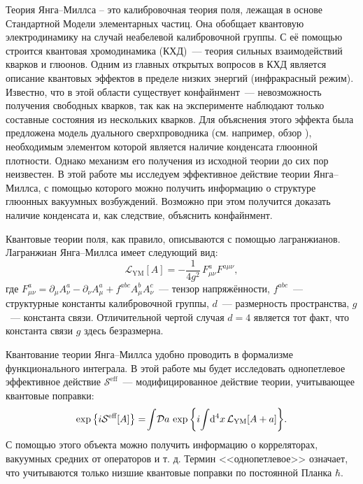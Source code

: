 
Теория Янга--Миллса -- это калибровочная теория поля, лежащая в основе Стандартной Модели элементарных частиц. Она обобщает квантовую электродинамику на случай неабелевой калибровочной группы. С её помощью строится квантовая хромодинамика (КХД)~--- теория сильных взаимодействий кварков и глюонов. Одним из главных открытых вопросов в КХД является описание квантовых эффектов в пределе низких энергий (инфракрасный режим). Известно, что в этой области существует конфайнмент~--- невозможность получения свободных кварков, так как на эксперименте наблюдают только составные состояния из нескольких кварков. Для объяснения этого эффекта была предложена модель дуального сверхпроводника (см. например, обзор \cite{Ripka2003}), необходимым элементом которой является наличие конденсата глюонной плотности. Однако механизм его получения из исходной теории до сих пор неизвестен. В этой работе мы исследуем эффективное действие теории Янга--Миллса, с помощью которого можно получить информацию о структуре глюонных вакуумных возбуждений. Возможно при этом получится доказать наличие конденсата и, как следствие, объяснить конфайнмент.

Квантовые теории поля, как правило, описываются с помощью лагранжианов. Лагранжиан Янга--Миллса имеет следующий вид:
\begin{equation*}
	\mathcal{L}_{\text{YM}}[A]=-\frac{1}{4g^2}\, F^a_{\mu \nu}F^{a\mu \nu},
\end{equation*}
где $F^a_{\mu \nu}=\partial_\mu A^a_\nu - \partial_\nu A^a_\mu + f^{abc}A^b_\mu A^c_\nu$~--- тензор напряжённости, $f^{abc}$~--- структурные константы калибровочной группы, $d$~--- размерность пространства, $g$~--- константа связи. Отличительной чертой случая $d=4$ является тот факт, что константа связи $g$ здесь безразмерна.

Квантование теории Янга--Миллса удобно проводить в формализме функционального интеграла. В этой работе мы будет исследовать однопетлевое эффективное действие $\mathcal{S}^{\text{eff}}$~--- модифицированное действие теории, учитывающее квантовые поправки:
\begin{equation*}
	\exp{\left\{i\mathcal{S}^{\text{eff}}[A]\right\}}=\!\int\!\mathcal{D}a\,\exp{\left\{i\!\int\!\mathrm{d}^4 x\,\mathcal{L}_{\text{YM}}[A+a]\right\}}.
\end{equation*}
С помощью этого объекта можно получить информацию о корреляторах, вакуумных средних от операторов и т. д. Термин <<однопетлевое>> означает, что учитываются только низшие квантовые поправки по постоянной Планка $\hbar$.

